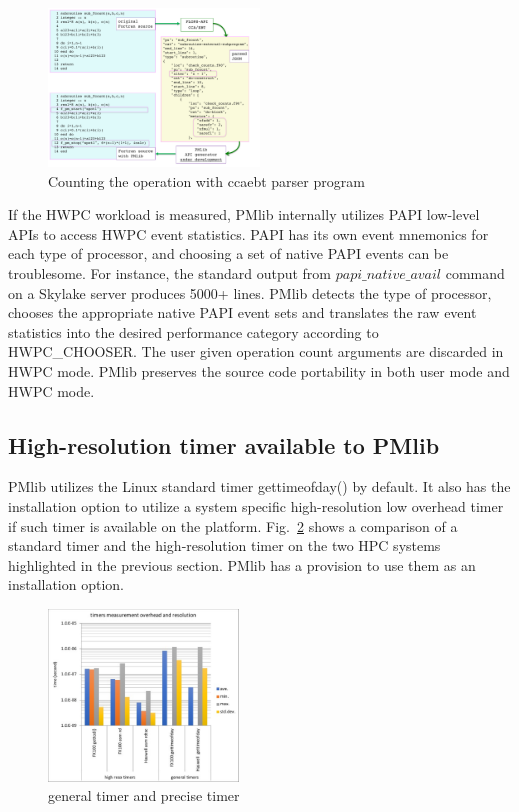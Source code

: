 \documentclass[conference]{IEEEtran}
\begin{document}
\begin{figure}[tb]
\centering
\includegraphics[width=0.5\textwidth]{figs/ccaebt4PMlib.pdf}
\caption{Counting the operation with ccaebt parser program}
\label{fig:ccaebt4PMlib}
\end{figure}

If the HWPC workload is measured,
PMlib internally utilizes PAPI low-level APIs to access HWPC event statistics.
PAPI has its own event mnemonics for each type of processor,
and choosing a set of native PAPI events can be troublesome.
For instance, the standard output from $ papi\_native\_avail $ command on a
Skylake server produces 5000+ lines.
PMlib detects the type of processor,
chooses the appropriate native PAPI event sets
and translates the raw event statistics into the desired
performance category according to HWPC\_CHOOSER.
The user given operation count arguments are discarded in HWPC mode.
PMlib preserves the source code portability in both user mode and HWPC mode.

\subsection{High-resolution timer available to PMlib}
PMlib utilizes the Linux standard timer gettimeofday() by default.
It also has the installation option to utilize
a system specific high-resolution low overhead timer if such timer is
available on the platform.
Fig.~\ref{fig:precise-timer} shows a comparison of a standard timer and
the high-resolution timer on the two HPC systems highlighted in the
previous section.
PMlib has a provision to use them as an installation option.
\begin{figure}[tb]
\centering
\includegraphics[width=0.45\textwidth]{figs/precise-timer.pdf}
\caption{general timer and precise timer}
\label{fig:precise-timer}
\end{figure}
\end{document}
